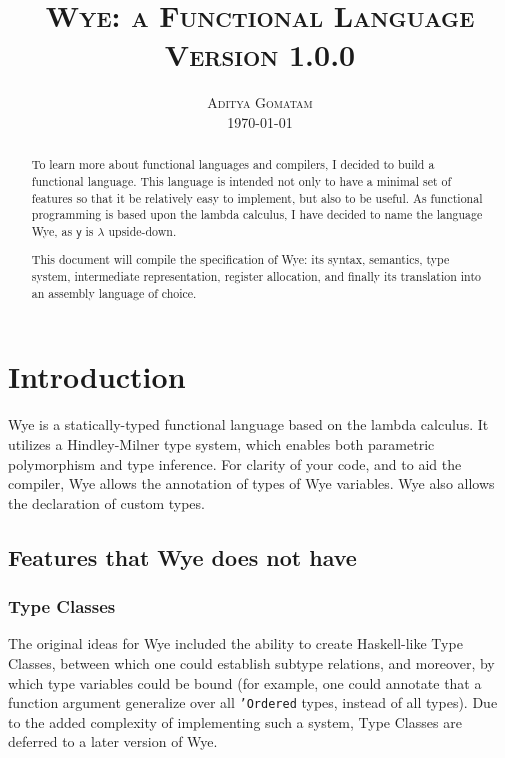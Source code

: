 \documentclass[a4paper, 12pt]{article}
\newcommand{\version}{1.0.0}
\begin{document}
\title{
\textsc{Wye: a Functional Language} \\
\vspace{2ex}
\large{\textsc{Version \version}}\\
\vspace{2ex}}

\author{\normalsize\textsc{Aditya Gomatam} \\ 
\normalsize{\today\vspace{2ex}}}
\date{}
\maketitle


\begin{abstract}
To learn more about functional languages and compilers, I decided to build a functional language. This language is intended not only to have a minimal set of features so that it be relatively easy to implement, but also to be useful. As functional programming is based upon the lambda calculus, I have decided to name the language Wye, as $\mathsf{y}$ is $\lambda$ upside-down.

This document will compile the specification of Wye: its syntax, semantics, type system, intermediate representation, register allocation, and finally its translation into an assembly language of choice.
\end{abstract}

\section{Introduction}
Wye is a statically-typed functional language based on the lambda calculus. It utilizes a Hindley-Milner type system, which enables both parametric polymorphism and type inference. For clarity of your code, and to aid the compiler, Wye allows the annotation of types of Wye variables. Wye also allows the declaration of custom types.

\subsection{Features that Wye does not have}

\subsubsection{Type Classes}
The original ideas for Wye included the ability to create Haskell-like Type Classes, between which one could establish subtype relations, and moreover, by which type variables could be bound (for example, one could annotate that a function argument generalize over all \texttt{'Ordered} types, instead of all types). Due to the added complexity of implementing such a system, Type Classes are deferred to a later version of Wye.
\end{document}

